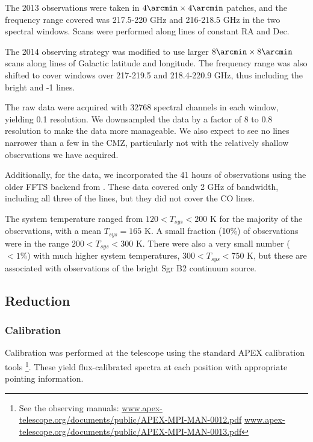 The 2013 observations were taken in $4\arcmin \times 4\arcmin$ patches, and the
frequency range covered was 217.5-220 GHz and 216-218.5 GHz in the two spectral
windows.  Scans were performed along lines of constant RA and Dec.

The 2014 observing strategy was modified to use larger $8\arcmin \times
8\arcmin$ scans along lines of Galactic latitude and longitude.  The frequency
range was also shifted to cover windows over 217-219.5 and 218.4-220.9 GHz, thus
including the bright \thirteenco and -1 lines.

The raw data were acquired with 32768 spectral channels in each window, yielding
0.1 \kms resolution.  We downsampled the data by a factor of 8 to 0.8 \kms
resolution to make the data more manageable.  We also expect to see no lines
narrower than a few \kms in the CMZ, particularly not with the relatively
shallow observations we have acquired.

Additionally, for the \para data, we incorporated the 41 hours of observations
using the older FFTS backend from \citet{Ao2013a}.  These data covered only 2
GHz of bandwidth, including all three of the \para lines, but they did not
cover the CO lines.

The system temperature ranged from $120 < T_{sys} < 200$ K for the majority of
the observations, with a mean $T_{sys}=165$ K.  A small fraction (10\%) of
observations were in the range $200 < T_{sys} < 300$ K.  There were also a very
small number ($<1\%$) with much higher system temperatures, $300 < T_{sys} <
750$ K, but these are associated with observations of the bright Sgr B2
continuum source.

\subsection{Reduction}
\subsubsection{Calibration}
Calibration was performed at the telescope using the standard APEX calibration
tools
\footnote{See the observing manuals:
\url{www.apex-telescope.org/documents/public/APEX-MPI-MAN-0012.pdf}
\url{www.apex-telescope.org/documents/public/APEX-MPI-MAN-0013.pdf} }.
These yield flux-calibrated spectra at each position with appropriate pointing
information.   %

